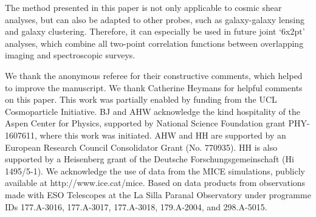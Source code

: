 \documentclass{aa}
\begin{document}
The method presented in this paper is not only applicable to cosmic shear analyses, but can also be adapted to other probes, such as galaxy-galaxy lensing and galaxy clustering. Therefore, it can especially be used in future joint `6x2pt' analyses, which combine all two-point correlation functions between overlapping imaging and spectroscopic surveys.
\begin{acknowledgements}
We thank the anonymous referee for their constructive comments, which helped to improve the manuscript.
We thank Catherine Heymans for helpful comments on this paper.
This work was partially enabled by funding from the UCL Cosmoparticle Initiative.
BJ and AHW acknowledge the kind hospitality of the Aspen Center for Physics, supported by National Science Foundation grant PHY-1607611, where this work was initiated.
AHW and HH are supported by an European Research Council Consolidator Grant (No. 770935).
HH is also supported by a Heisenberg grant of the Deutsche Forschungsgemeinschaft (Hi 1495/5-1). 
We acknowledge the use of data from the MICE simulations, publicly available at http://www.ice.cat/mice.
Based on data products from observations made with ESO Telescopes at the La Silla Paranal Observatory under programme IDs 177.A-3016, 177.A-3017, 177.A-3018, 179.A-2004, and 298.A-5015.
\end{acknowledgements}



\end{document}
